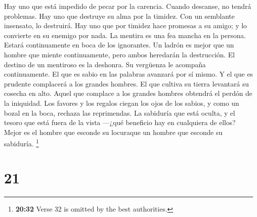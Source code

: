 Hay uno que está impedido de pecar por la carencia.
Cuando descanse, no tendrá problemas.  Hay uno que
destruye su alma por la timidez. Con un semblante insensato, lo
destruirá.  Hay uno que por timidez hace promesas a su
amigo; y lo convierte en su enemigo por nada.  La mentira
es una fea mancha en la persona. Estará continuamente en boca de los
ignorantes.  Un ladrón es mejor que un hombre que miente
continuamente, pero ambos heredarán la destrucción.  El
destino de un mentiroso es la deshonra. Su vergüenza le acompaña
continuamente.  El que es sabio en las palabras avanzará
por sí mismo. Y el que es prudente complacerá a los grandes hombres.
 El que cultiva su tierra levantará su cosecha en alto.
Aquel que complace a los grandes hombres obtendrá el perdón de la
iniquidad.  Los favores y los regalos ciegan los ojos de
los sabios, y como un bozal en la boca, rechaza las reprimendas.
 La sabiduría que está oculta, y el tesoro que está fuera
de la vista ---¿qué beneficio hay en cualquiera de ellos?
 Mejor es el hombre que esconde su locuraque un hombre
que esconde su sabiduría.  \footnote{\textbf{20:32} Verse
  32 is omitted by the best authorities.}

\hypertarget{section-20}{%
\section{21}\label{section-20}}

